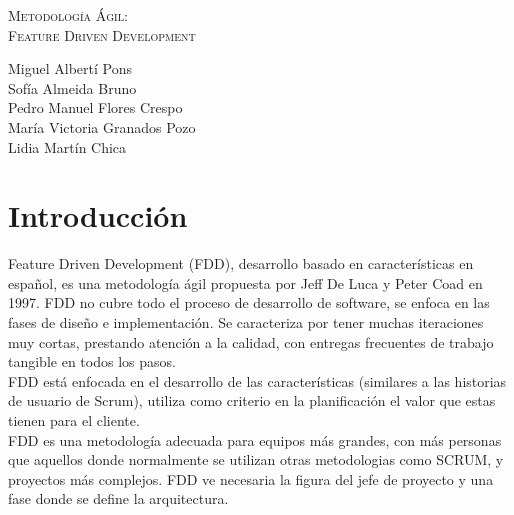 \documentclass[11pt]{article}
\begin{document}
\begin{titlepage}
\centering
\vspace{4.5cm}
{\scshape\LARGE Metodología Ágil:\\ Feature Driven Development\par}
\vspace{1.5cm}


\vspace{3cm}
{\scshape\large \par}
\vspace{1cm}

{Miguel Albertí Pons\\
Sofía Almeida Bruno\\
Pedro Manuel Flores Crespo\\
María Victoria Granados Pozo\\
Lidia Martín Chica
\par}

\end{titlepage}

\thispagestyle{empty}
\tableofcontents

\newpage

\section{Introducción}

Feature Driven Development (FDD), desarrollo basado en características en español, es una metodología ágil propuesta por Jeff De Luca y Peter Coad en 1997. FDD no cubre todo el proceso de desarrollo de software, se enfoca en las fases de diseño e implementación. Se caracteriza por tener muchas iteraciones muy cortas, prestando atención a la calidad, con entregas frecuentes de trabajo tangible en todos los pasos.\\

FDD está enfocada en el desarrollo de las características (similares a las historias de usuario de Scrum), utiliza como criterio en la planificación el valor que estas tienen para el cliente.\\

FDD es una metodología adecuada para equipos más grandes, con más personas que aquellos donde normalmente se utilizan otras metodologias como SCRUM, y proyectos más complejos. FDD ve necesaria la figura del jefe de proyecto y una fase donde se define la arquitectura.\\
\end{document}
